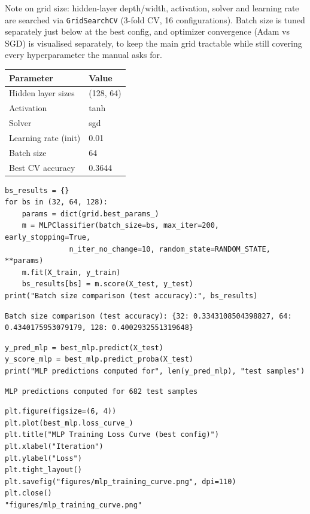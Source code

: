 \documentclass[11pt]{article}
\begin{document}
Note on grid size: hidden-layer depth/width, activation, solver and learning rate are
searched via \texttt{GridSearchCV} (3-fold CV, 16 configurations). Batch size is tuned separately
just below at the best config, and optimizer convergence (Adam vs SGD) is visualised
separately, to keep the main grid tractable while still covering every hyperparameter the
manual asks for.

\begin{center}
\begin{tabular}{ll}
\hline
Parameter & Value\\
\hline
Hidden layer sizes & (128, 64)\\
Activation & tanh\\
Solver & sgd\\
Learning rate (init) & 0.01\\
Batch size & 64\\
Best CV accuracy & 0.3644\\
\hline
\end{tabular}
\end{center}

\begin{verbatim}
bs_results = {}
for bs in (32, 64, 128):
    params = dict(grid.best_params_)
    m = MLPClassifier(batch_size=bs, max_iter=200, early_stopping=True,
		       n_iter_no_change=10, random_state=RANDOM_STATE, **params)
    m.fit(X_train, y_train)
    bs_results[bs] = m.score(X_test, y_test)
print("Batch size comparison (test accuracy):", bs_results)
\end{verbatim}

\begin{verbatim}
Batch size comparison (test accuracy): {32: 0.3343108504398827, 64: 0.4340175953079179, 128: 0.4002932551319648}
\end{verbatim}


\begin{verbatim}
y_pred_mlp = best_mlp.predict(X_test)
y_score_mlp = best_mlp.predict_proba(X_test)
print("MLP predictions computed for", len(y_pred_mlp), "test samples")
\end{verbatim}

\begin{verbatim}
MLP predictions computed for 682 test samples
\end{verbatim}


\begin{verbatim}
plt.figure(figsize=(6, 4))
plt.plot(best_mlp.loss_curve_)
plt.title("MLP Training Loss Curve (best config)")
plt.xlabel("Iteration")
plt.ylabel("Loss")
plt.tight_layout()
plt.savefig("figures/mlp_training_curve.png", dpi=110)
plt.close()
"figures/mlp_training_curve.png"
\end{verbatim}
\end{document}
